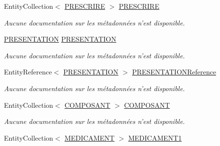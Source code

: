 \begin{DoxyCompactItemize}
Entity\-Collection$<$ \hyperlink{class_model_1_1_p_r_e_s_c_r_i_r_e}{P\-R\-E\-S\-C\-R\-I\-R\-E} $>$ \hyperlink{class_model_1_1_m_e_d_i_c_a_m_e_n_t_a88b07188c015f24de7f93837eeaa98b1}{P\-R\-E\-S\-C\-R\-I\-R\-E}
\begin{DoxyCompactList}\small\item\em Aucune documentation sur les métadonnées n'est disponible. \end{DoxyCompactList}\item 
\hyperlink{class_model_1_1_p_r_e_s_e_n_t_a_t_i_o_n}{P\-R\-E\-S\-E\-N\-T\-A\-T\-I\-O\-N} \hyperlink{class_model_1_1_m_e_d_i_c_a_m_e_n_t_a79fed0d0e87a9735a0a0a9f41f6da286}{P\-R\-E\-S\-E\-N\-T\-A\-T\-I\-O\-N}
\begin{DoxyCompactList}\small\item\em Aucune documentation sur les métadonnées n'est disponible. \end{DoxyCompactList}\item 
Entity\-Reference$<$ \hyperlink{class_model_1_1_p_r_e_s_e_n_t_a_t_i_o_n}{P\-R\-E\-S\-E\-N\-T\-A\-T\-I\-O\-N} $>$ \hyperlink{class_model_1_1_m_e_d_i_c_a_m_e_n_t_a8ee1a7d474625d4c02b7a3145dbfbcf6}{P\-R\-E\-S\-E\-N\-T\-A\-T\-I\-O\-N\-Reference}
\begin{DoxyCompactList}\small\item\em Aucune documentation sur les métadonnées n'est disponible. \end{DoxyCompactList}\item 
Entity\-Collection$<$ \hyperlink{class_model_1_1_c_o_m_p_o_s_a_n_t}{C\-O\-M\-P\-O\-S\-A\-N\-T} $>$ \hyperlink{class_model_1_1_m_e_d_i_c_a_m_e_n_t_a1faa12602862fab1081752b148f1745b}{C\-O\-M\-P\-O\-S\-A\-N\-T}
\begin{DoxyCompactList}\small\item\em Aucune documentation sur les métadonnées n'est disponible. \end{DoxyCompactList}\item 
Entity\-Collection$<$ \hyperlink{class_model_1_1_m_e_d_i_c_a_m_e_n_t}{M\-E\-D\-I\-C\-A\-M\-E\-N\-T} $>$ \hyperlink{class_model_1_1_m_e_d_i_c_a_m_e_n_t_a1aa6c5c5d0fb3c9ff49ea59b184b71f7}{M\-E\-D\-I\-C\-A\-M\-E\-N\-T1}

\end{DoxyCompactItemize}
